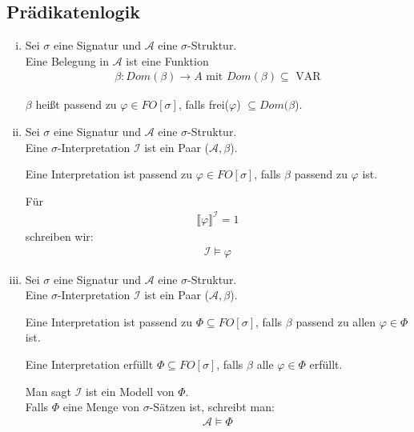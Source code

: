 \documentclass[a4paper,10pt]{article}
\begin{document}
	\subsection*{Prädikatenlogik}
		\begin{enumerate}[(i)]
			\item
				Sei $\sigma$ eine Signatur und $\mathcal{A}$ eine $\sigma$-Struktur.\\
				
				Eine Belegung in $\mathcal{A}$ ist eine Funktion 
				\begin{align*}
					\beta: Dom(\beta) \rightarrow A \text{ mit } Dom(\beta) \subseteq \text{ VAR}
				\end{align*}
				
				
				$\beta$ heißt passend zu $\varphi \in FO[\sigma]$, falls frei($\varphi$) $\subseteq Dom(\beta$). 
			
			\item
				Sei $\sigma$ eine Signatur und $\mathcal{A}$ eine $\sigma$-Struktur.\\
				
				Eine $\sigma$-Interpretation $\mathcal{I}$ ist ein Paar ($\mathcal{A}, \beta$).
				
				Eine Interpretation ist passend zu $\varphi \in FO[\sigma]$, falls $\beta$ passend zu $\varphi$ ist.
				
				Für 
				\begin{align*}
					\llbracket \varphi \rrbracket^{\mathcal{I}} = 1
				\end{align*}
				schreiben wir:
				\begin{align*}
					\mathcal{I} \vDash \varphi
				\end{align*}
				
			\item
				Sei $\sigma$ eine Signatur und $\mathcal{A}$ eine $\sigma$-Struktur.\\
				
				Eine $\sigma$-Interpretation $\mathcal{I}$ ist ein Paar ($\mathcal{A}, \beta$).
				
				Eine Interpretation ist passend zu $\Phi \subseteq FO[\sigma]$, falls $\beta$ passend zu allen $\varphi \in \Phi$ ist.
				
				Eine Interpretation erfüllt $\Phi \subseteq FO[\sigma]$, falls $\beta$ alle $\varphi \in \Phi$ erfüllt.
				
				Man sagt $\mathcal{I}$ ist ein Modell von $\Phi$.\\
				
				Falls $\Phi$ eine Menge von $\sigma$-Sätzen ist, schreibt man:
				\begin{align*}
					\mathcal{A} \vDash \Phi
				\end{align*}
				

\end{enumerate}
\end{document}
